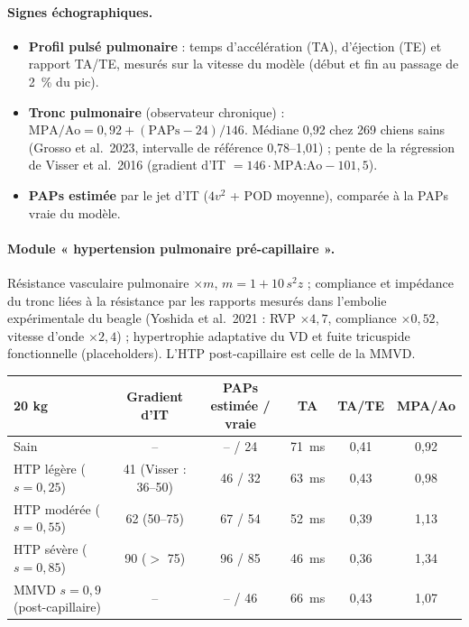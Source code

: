 \documentclass[10pt,a4paper]{article}
\begin{document}
\paragraph{Signes échographiques.}
\begin{itemize}
\item \textbf{Profil pulsé pulmonaire} : temps d'accélération (TA), d'éjection (TE) et rapport TA/TE, mesurés sur la
vitesse du modèle (début et fin au passage de 2~\% du pic).
\item \textbf{Tronc pulmonaire} (observateur chronique) : $\text{MPA/Ao} = 0{,}92 + (\text{PAPs} - 24)/146$. Médiane
0,92 chez 269 chiens sains (Grosso et al.\ 2023, intervalle de référence 0,78--1,01) ; pente de la régression de Visser
et al.\ 2016 (gradient d'IT $= 146\cdot\text{MPA:Ao} - 101{,}5$).
\item \textbf{PAPs estimée} par le jet d'IT ($4v^2$ + POD moyenne), comparée à la PAPs vraie du modèle.
\end{itemize}

\paragraph{Module « hypertension pulmonaire pré-capillaire ».} Résistance vasculaire pulmonaire $\times m$,
$m = 1 + 10\,s^2 z$ ; compliance et impédance du tronc liées à la résistance par les rapports mesurés dans l'embolie
expérimentale du beagle (Yoshida et al.\ 2021 : RVP $\times 4{,}7$, compliance $\times 0{,}52$, vitesse d'onde
$\times 2{,}4$) ; hypertrophie adaptative du VD et fuite tricuspide fonctionnelle (placeholders). L'HTP post-capillaire
est celle de la MMVD.

\begin{tabularx}{\linewidth}{@{}Xccccc@{}}
\toprule
20 kg & Gradient d'IT & PAPs estimée / vraie & TA & TA/TE & MPA/Ao\\\midrule
Sain & -- & -- / 24 & \SI{71}{ms} & 0,41 & 0,92\\
HTP légère ($s = 0{,}25$) & 41 (Visser : 36--50) & 46 / 32 & \SI{63}{ms} & 0,43 & 0,98\\
HTP modérée ($s = 0{,}55$) & 62 (50--75) & 67 / 54 & \SI{52}{ms} & 0,39 & 1,13\\
HTP sévère ($s = 0{,}85$) & 90 ($>$ 75) & 96 / 85 & \SI{46}{ms} & 0,36 & 1,34\\
MMVD $s = 0{,}9$ (post-capillaire) & -- & -- / 46 & \SI{66}{ms} & 0,43 & 1,07\\
\bottomrule
\end{tabularx}
\end{document}
